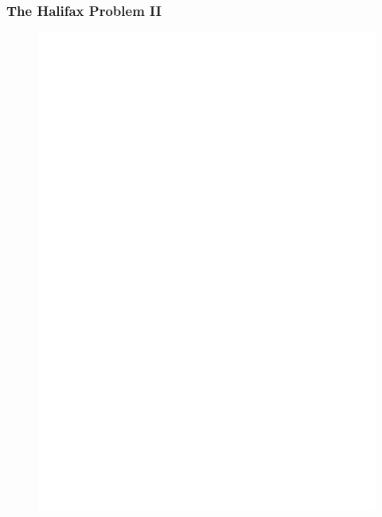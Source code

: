 \documentclass[xcolor=dvipsnames]{beamer}
\begin{document}
\begin{frame}
  \frametitle{The Halifax Problem II}
  \begin{figure}[h]
    \includegraphics[scale=.7]{./bcita-01.eps}
  \end{figure}
\end{frame}
\end{document}
